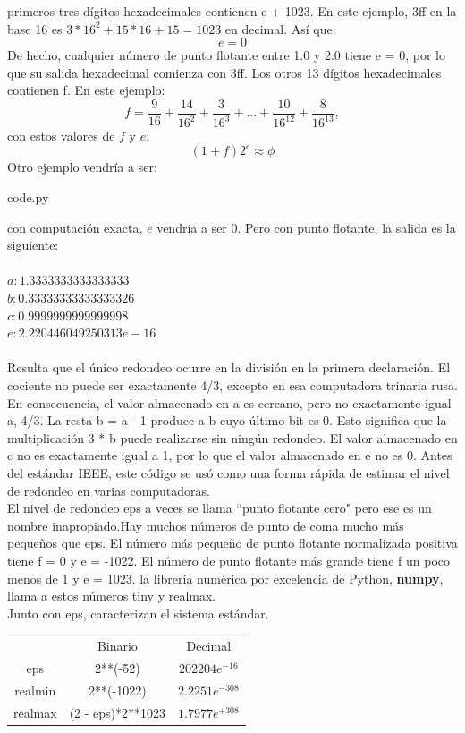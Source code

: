 \documentclass[12pt]{article}
\begin{document}
primeros tres dígitos hexadecimales contienen e + 1023. En este ejemplo, 3ff en la base 16
es $3*16^2 + 15*16 + 15 = 1023$ en decimal. Así que.
$$e = 0$$
De hecho, cualquier número de punto flotante entre 1.0 y 2.0 tiene e = 0, por lo que su salida
hexadecimal comienza con 3ff. Los otros 13 dígitos hexadecimales contienen f. En este
ejemplo:
$$f = \frac{9}{16}+\frac{14}{16^2}+\frac{3}{16^3}+...+\frac{10}{16^{12}}+\frac{8}{16^{13}},$$
con estos valores de $f$ y $e$:
$$(1+f)2^e \approx \phi$$
Otro ejemplo vendr\'ia a ser:
\begin{center}

{code.py}
\end{center}
con computaci\'on exacta, $e$ vendr\'ia a ser 0. Pero con punto flotante, la salida es la siguiente:\\\\
$a: 1.3333333333333333$\\
$b: 0.33333333333333326$\\
$c: 0.9999999999999998$\\
$e: 2.220446049250313e-16$\\\\
Resulta que el único redondeo ocurre en la división en la primera declaración. El cociente no
puede ser exactamente 4/3, excepto en esa computadora trinaria rusa. En consecuencia, el
valor almacenado en a es cercano, pero no exactamente igual a, 4/3. La resta b = a - 1
produce a b cuyo último bit es 0. Esto significa que la multiplicación 3 * b puede realizarse sin
ningún redondeo. El valor almacenado en c no es exactamente igual a 1, por lo que el valor
almacenado en e no es 0. Antes del estándar IEEE, este código se usó como una forma
rápida de estimar el nivel de redondeo en varias computadoras.\\
El nivel de redondeo eps a veces se llama “punto flotante cero" pero ese es un nombre
inapropiado.Hay muchos números de punto de coma mucho más pequeños que eps. El número más
pequeño de punto flotante normalizada positiva tiene f = 0 y e = -1022. El número de punto
flotante más grande tiene f un poco menos de 1 y e = 1023. la librer\'ia num\'erica por excelencia de Python, \textbf{numpy}, llama a estos números
tiny y realmax.\\
Junto con eps, caracterizan el sistema estándar.
\begin{center}
  \begin{tabular}{c c c}
    & Binario & Decimal\\
    eps & 2**(-52) & $202204e^{-16}$\\
    realmin & 2**(-1022) & $2.2251e^{-308}$\\
    realmax & (2 - eps)*2**1023 & $1.7977e^{+308}$
  \end{tabular}
\end{center}
\end{document}
